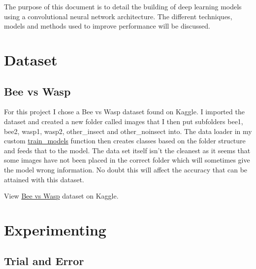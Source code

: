 \documentclass[
  letterpaper,
  DIV=11,
  numbers=noendperiod]{scrartcl}
\begin{document}
The purpose of this document is to detail the building of deep learning
models using a convolutional neural network architecture. The different
techniques, models and methods used to improve performance will be
discussed.

\hypertarget{dataset}{%
\section{Dataset}\label{dataset}}

\hypertarget{bee-vs-wasp}{%
\subsection{Bee vs Wasp}\label{bee-vs-wasp}}

For this project I chose a Bee vs Wasp dataset found on Kaggle. I
imported the dataset and created a new folder called images that I then
put subfolders bee1, bee2, wasp1, wasp2, other\_insect and
other\_noinsect into. The data loader in my custom
\protect\hyperlink{custom-trainmodels}{train\_models} function then
creates classes based on the folder structure and feeds that to the
model. The data set itself isn't the cleanest as it seems that some
images have not been placed in the correct folder which will sometimes
give the model wrong information. No doubt this will affect the accuracy
that can be attained with this dataset.

\begin{tcolorbox}[enhanced jigsaw, opacityback=0, toprule=.15mm, colbacktitle=quarto-callout-tip-color!10!white, opacitybacktitle=0.6, leftrule=.75mm, colback=white, breakable, bottomtitle=1mm, arc=.35mm, toptitle=1mm, left=2mm, colframe=quarto-callout-tip-color-frame, titlerule=0mm, coltitle=black, rightrule=.15mm, title=\textcolor{quarto-callout-tip-color}{\faLightbulb}\hspace{0.5em}{Dataset}, bottomrule=.15mm]

View
\href{https://www.kaggle.com/datasets/jerzydziewierz/bee-vs-wasp}{Bee vs
Wasp} dataset on Kaggle.

\end{tcolorbox}

\hypertarget{experimenting}{%
\section{Experimenting}\label{experimenting}}

\hypertarget{trial-and-error}{%
\subsection{Trial and Error}\label{trial-and-error}}
\end{document}
